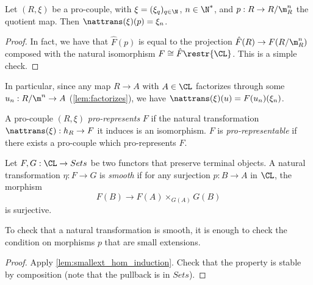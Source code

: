 \begin{lemma}
  \label{lem:completion_map_quot_mk_eq_pi}
  \leanok
  Let $(R, \xi)$ be a pro-couple, with $\xi = (\xi_q)_{q\in\N}$, $n\in\N^*$,
  and $p:R\to R/\m_R^n$ the quotient map. Then $\nattrans(\xi) (p) = \xi_n$.
\end{lemma}

\begin{proof}
  \leanok
  In fact, we have that $\hat{F}(p)$ is equal to the projection
  $\hat{F}(R) \to F(R / \m_R^n)$ composed with the natural isomorphism
  $F \cong \hat{F}\restr{\CL}$.
  This is a simple check. %
\end{proof}

In particular, since any map $R \to A$ with $A \in \CL$ factorizes through
some $u_n : R / \m^n \to A$ (\cref{lem:factorizes}),
we have $\nattrans(\xi) (u) = F(u_n) (\xi_n)$.

\begin{definition}
  \label{def:Prorepresents}
  \leanok
  A pro-couple $(R, \xi)$ \emph{pro-represents} $F$
  if the natural transformation $\nattrans(\xi) : h_R \to F$ it
  induces is an isomorphism.
  $F$ is \emph{pro-representable} if there exists a pro-couple which
  pro-represents $F$.
\end{definition}

\begin{definition}
  \label{def:IsSmooth}
  \leanok
  Let $F, G : \CL \to Sets$ be two functors that preserve terminal objects.
  A natural transformation $\eta : F \to G$ is \emph{smooth}
  if for any surjection
  $p : B \to A$ in $\CL$,
  the morphism
  \[ F(B) \to F(A) \times_{G(A)} G(B)\]
  is surjective.
\end{definition}

\begin{lemma}
  \label{lem:smoothsmallext}
  \leanok
  To check that a natural transformation is smooth, it is enough
  to check the condition on morphisms $p$ that are small extensions.
\end{lemma}

\begin{proof}
  \leanok
  Apply \cref{lem:smallext_hom_induction}.
  Check that the property
  is stable by composition (note that the pullback is in $Sets$).
\end{proof}

